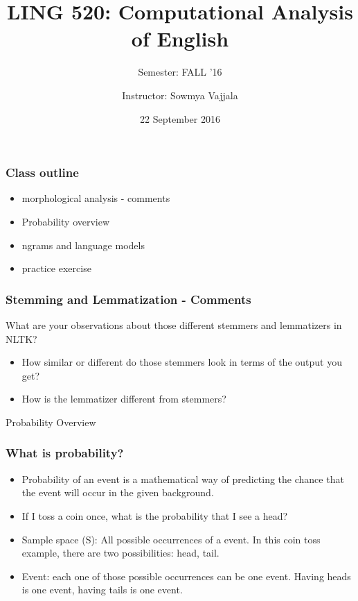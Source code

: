 \documentclass{beamer}
\author[Sowmya Vajjala]{Instructor: Sowmya Vajjala}
\title[LING 520]{LING 520: Computational Analysis of English}
\subtitle{Semester: FALL '16}
\date{22 September 2016}
\institute{Iowa State University, USA}
\begin{document}
\begin{frame}\titlepage
\end{frame}

\begin{frame}
\frametitle{Class outline}
\begin{itemize}
\item morphological analysis - comments %
\item Probability overview %
\item ngrams and language models %
\item practice exercise %
\end{itemize}
\end{frame}

\begin{frame}
\frametitle{Stemming and Lemmatization - Comments}
What are your observations about those different stemmers and lemmatizers in NLTK?
\begin{itemize}
\item How similar or different do those stemmers look in terms of the output you get?
\item How is the lemmatizer different from stemmers?
\end{itemize}
\end{frame}

\begin{frame}
\begin{center}
\Large Probability Overview
\end{center}
\end{frame}

\begin{frame}
\frametitle{What is probability?}
\begin{itemize}
\item Probability of an event is a mathematical way of predicting the chance that the event will occur in the given background.
\item If I toss a coin once, what is the probability that I see a head? \pause
\item Sample space (S): All possible occurrences of a event. In this coin toss example, there are two possibilities: head, tail.
\item Event: each one of those possible occurrences can be one event. Having heads is one event, having tails is one event.
\end{itemize}
\end{frame}
\end{document}
